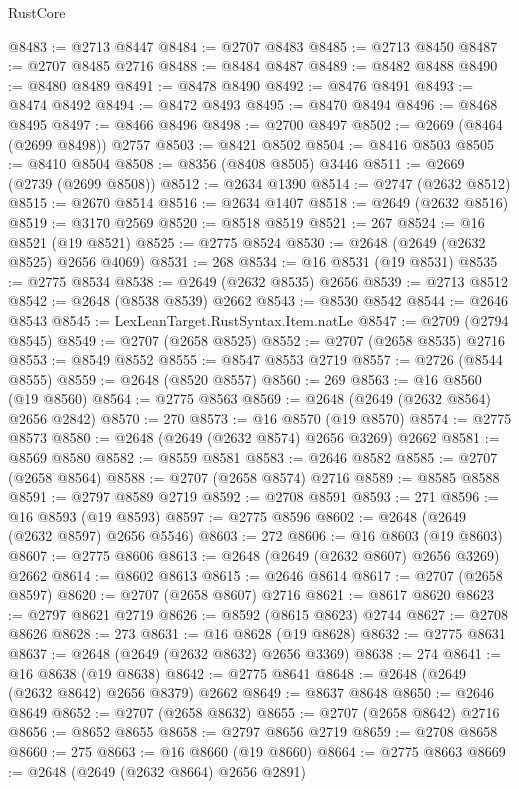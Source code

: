 \begin{lexlean}{RustCore}
\begin{coremodule}
@8483 := @2713 @8447
@8484 := @2707 @8483
@8485 := @2713 @8450
@8487 := @2707 @8485 @2716
@8488 := @8484 @8487
@8489 := @8482 @8488
@8490 := @8480 @8489
@8491 := @8478 @8490
@8492 := @8476 @8491
@8493 := @8474 @8492
@8494 := @8472 @8493
@8495 := @8470 @8494
@8496 := @8468 @8495
@8497 := @8466 @8496
@8498 := @2700 @8497
@8502 := @2669 (@8464 (@2699 @8498)) @2757
@8503 := @8421 @8502
@8504 := @8416 @8503
@8505 := @8410 @8504
@8508 := @8356 (@8408 @8505) @3446
@8511 := @2669 (@2739 (@2699 @8508))
@8512 := @2634 @1390
@8514 := @2747 (@2632 @8512)
@8515 := @2670 @8514
@8516 := @2634 @1407
@8518 := @2649 (@2632 @8516)
@8519 := @3170 @2569
@8520 := @8518 @8519
@8521 := 267
@8524 := @16 @8521 (@19 @8521)
@8525 := @2775 @8524
@8530 := @2648 (@2649 (@2632 @8525) @2656 @4069)
@8531 := 268
@8534 := @16 @8531 (@19 @8531)
@8535 := @2775 @8534
@8538 := @2649 (@2632 @8535) @2656
@8539 := @2713 @8512
@8542 := @2648 (@8538 @8539) @2662
@8543 := @8530 @8542
@8544 := @2646 @8543
@8545 := LexLeanTarget.RustSyntax.Item.natLe
@8547 := @2709 (@2794 @8545)
@8549 := @2707 (@2658 @8525)
@8552 := @2707 (@2658 @8535) @2716
@8553 := @8549 @8552
@8555 := @8547 @8553 @2719
@8557 := @2726 (@8544 @8555)
@8559 := @2648 (@8520 @8557)
@8560 := 269
@8563 := @16 @8560 (@19 @8560)
@8564 := @2775 @8563
@8569 := @2648 (@2649 (@2632 @8564) @2656 @2842)
@8570 := 270
@8573 := @16 @8570 (@19 @8570)
@8574 := @2775 @8573
@8580 := @2648 (@2649 (@2632 @8574) @2656 @3269) @2662
@8581 := @8569 @8580
@8582 := @8559 @8581
@8583 := @2646 @8582
@8585 := @2707 (@2658 @8564)
@8588 := @2707 (@2658 @8574) @2716
@8589 := @8585 @8588
@8591 := @2797 @8589 @2719
@8592 := @2708 @8591
@8593 := 271
@8596 := @16 @8593 (@19 @8593)
@8597 := @2775 @8596
@8602 := @2648 (@2649 (@2632 @8597) @2656 @5546)
@8603 := 272
@8606 := @16 @8603 (@19 @8603)
@8607 := @2775 @8606
@8613 := @2648 (@2649 (@2632 @8607) @2656 @3269) @2662
@8614 := @8602 @8613
@8615 := @2646 @8614
@8617 := @2707 (@2658 @8597)
@8620 := @2707 (@2658 @8607) @2716
@8621 := @8617 @8620
@8623 := @2797 @8621 @2719
@8626 := @8592 (@8615 @8623) @2744
@8627 := @2708 @8626
@8628 := 273
@8631 := @16 @8628 (@19 @8628)
@8632 := @2775 @8631
@8637 := @2648 (@2649 (@2632 @8632) @2656 @3369)
@8638 := 274
@8641 := @16 @8638 (@19 @8638)
@8642 := @2775 @8641
@8648 := @2648 (@2649 (@2632 @8642) @2656 @8379) @2662
@8649 := @8637 @8648
@8650 := @2646 @8649
@8652 := @2707 (@2658 @8632)
@8655 := @2707 (@2658 @8642) @2716
@8656 := @8652 @8655
@8658 := @2797 @8656 @2719
@8659 := @2708 @8658
@8660 := 275
@8663 := @16 @8660 (@19 @8660)
@8664 := @2775 @8663
@8669 := @2648 (@2649 (@2632 @8664) @2656 @2891)

\end{coremodule}
\end{lexlean}
